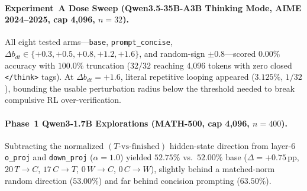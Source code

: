 \documentclass[10pt]{article}
\begin{document}
\paragraph{Experiment~A Dose Sweep (Qwen3.5-35B-A3B Thinking Mode, AIME 2024--2025, cap 4,096, $n=32$).}
All eight tested arms---\texttt{base}, \texttt{prompt\_concise}, $\Delta b_{dt}\in\{+0.3, +0.5, +0.8, +1.2, +1.6\}$, and random-sign $\pm 0.8$---scored $0.00\%$ accuracy with $100.0\%$ truncation ($32/32$ reaching 4,096 tokens with zero closed \texttt{</think>} tags). At $\Delta b_{dt}=+1.6$, literal repetitive looping appeared ($3.125\%$, $1/32$), bounding the usable perturbation radius below the threshold needed to break compulsive RL over-verification.

\paragraph{Phase~1 Qwen3-1.7B Explorations (MATH-500, cap 4,096, $n=400$).}
Subtracting the normalized $(T\text{-vs-finished})$ hidden-state direction from layer-6 \texttt{o\_proj} and \texttt{down\_proj} ($\alpha=1.0$) yielded $52.75\%$ vs.\ $52.00\%$ base ($\Delta=+0.75$\,pp, $20\,T\!\to\!C$, $17\,C\!\to\!T$, $0\,W\!\to\!C$, $0\,C\!\to\!W$), slightly behind a matched-norm random direction ($53.00\%$) and far behind concision prompting ($63.50\%$).
\end{document}
